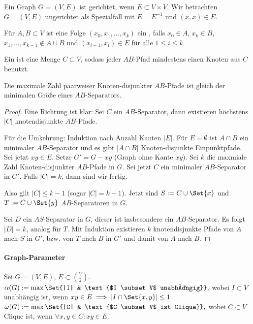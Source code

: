 \begin{df}
    Ein Graph $G = (V, E)$ ist gerichtet, wenn $E \subset V \times V$.
    Wir betrachten $G = (V, E)$ ungerichtet als Spezialfall mit $E = E^{-1}$ und $(x,x) \in E$.

    Für $A, B \subset V$ ist eine Folge $(x_0, x_1, \dotsc, x_k)$ ein , falls $x_0 \in A$, $x_k \in B$,
    $x_1, \dotsc, x_{k-1} \not\in A \cup B$ und $(x_{i-1}, x_i) \in E$ für alle $1 \le i \le k$.

    Ein  ist eine Menge $C \subset V$, sodass jeder $AB$-Pfad mindestens einen Knoten aus $C$ benutzt.
\end{df}

\begin{st}[Menger, 1929]
    Die maximale Zahl paarweiser Knoten-disjunkter $AB$-Pfade ist gleich der minimalen Größe eines $AB$-Separators.
    \begin{proof}
        Eine Richtung ist klar: Sei $C$ ein $AB$-Separator, dann existieren höchstens $|C|$ knotendisjunkte $AB$-Pfade.

        Für die Umkehrung: Induktion nach Anzahl Kanten $|E|$.
        Für $E = \emptyset$ ist $A \cap B$ ein minimaler $AB$-Separator und es gibt $|A \cap B|$ Knoten-disjunkte Einpunktpfade.
        Sei jetzt $xy \in E$.
        Setze $G' = G - xy$ (Graph ohne Kante $xy$).
        Sei $k$ die maxmiale Zahl Knoten-disjunkter $AB$-Pfade in $G$.
        Sei jetzt $C$ ein minimaler $AB$-Separator in $G'$.
        Falls $|C| = k$, dann sind wir fertig.

        Also gilt $|C| \le k-1$ (sogar $|C| = k-1$).
        Jetzt sind $S := C \cup \Set{x}$ und $T := C \cup \Set{y}$ $AB$-Separatoren in $G$.

        Sei $D$ ein $AS$-Separator in $G$, dieser ist insbesondere ein $AB$-Separator.
        Es folgt $|D| = k$, analog für $T$.
        Mit Induktion existieren $k$ knotendisjunkte Pfade von $A$ nach $S$ in $G'$, bzw. von $T$ nach $B$ in $G'$ und damit von $A$ nach $B$.
    \end{proof}
\end{st}


\paragraph{Graph-Parameter}


Sei $G = (V, E)$, $E \subset \binom{V}{2}$.
\begin{math}
    \alpha(G) := \max\Set{|I| & \text{$I \subset V$ unabhängig}},
\end{math}
wobei $I \subset V$ unabhängig ist, wenn $xy \in E \implies |I \cap \Set{x,y}| \le 1$.
\begin{math}
    \omega(G) := \max\Set{|C| & \text{$C \subset V$ ist Clique}},
\end{math}
wobei $C \subset V$ Clique ist, wenn $\forall x,y \in C : xy \in E$.

